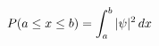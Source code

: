 \documentclass[preview]{standalone}
\begin{document}
\begin{align*}
\special{dvisvgm:raw <g id='unique000'>}P(a \le x \le b) = \int_a^b |\psi|^2\,dx\special{dvisvgm:raw </g>}
\end{align*}
\end{document}
